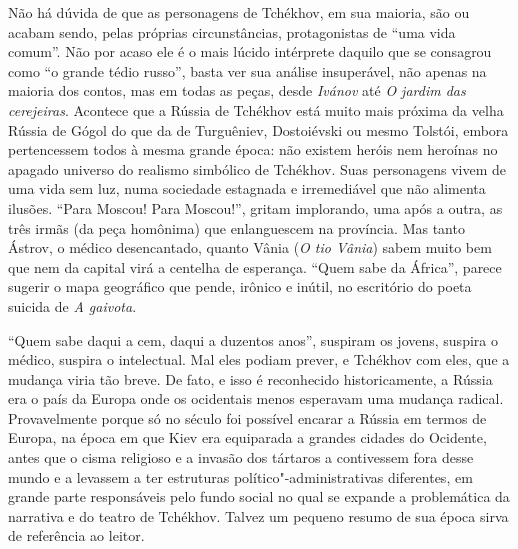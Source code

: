 Não há dúvida de que as personagens de Tchékhov, em sua maioria,
são ou acabam sendo, pelas próprias circunstâncias, protagonistas
de ``uma vida comum''. Não por acaso ele é o mais lúcido
intérprete daquilo que se consagrou como ``o grande tédio russo'',
basta ver sua análise insuperável, não apenas na maioria dos contos,
mas em todas as peças, desde \emph{Ivánov} até \emph{O jardim das
cerejeiras}. Acontece que a Rússia de Tchékhov está muito mais
próxima da velha Rússia de Gógol do que da de Turguêniev,
Dostoiévski ou mesmo Tolstói, embora pertencessem todos à mesma
grande época: não existem heróis nem heroínas no apagado universo
do realismo simbólico de Tchékhov. Suas personagens vivem de uma
vida sem luz, numa sociedade estagnada e irremediável que não
alimenta ilusões. ``Para Moscou! Para Moscou!'', gritam implorando,
uma após a outra, as três irmãs (da peça homônima) que enlanguescem
na província. Mas tanto Ástrov, o médico desencantado, quanto Vânia
(\emph{O tio Vânia}) sabem muito bem que nem da capital virá a
centelha de esperança. ``Quem sabe da África'', parece sugerir o
mapa geográfico que pende, irônico e inútil, no escritório do poeta
suicida de \emph{A gaivota}.

``Quem sabe daqui a cem, daqui a duzentos anos'', suspiram os
jovens, suspira o médico, suspira o intelectual. Mal eles podiam
prever, e Tchékhov com eles, que a mudança viria tão breve. De
fato, e isso é reconhecido historicamente, a Rússia era o país
da Europa onde os ocidentais menos esperavam uma mudança radical.
Provavelmente porque só no século  foi possível encarar
a Rússia em termos de Europa, na época em que Kiev era equiparada
a grandes cidades do Ocidente, antes que o cisma religioso e a
invasão dos tártaros a contivessem fora desse mundo e a levassem
a ter estruturas político"-administrativas diferentes, em grande
parte responsáveis pelo fundo social no qual se expande a problemática
da narrativa e do teatro de Tchékhov. Talvez um pequeno resumo de sua
época sirva de referência ao leitor.

